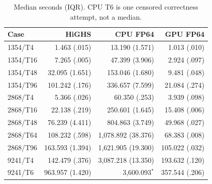 \documentclass[10pt,journal]{IEEEtran}
\begin{document}
\begin{table}[!t]
\caption{Median seconds (IQR). CPU T6 is one censored correctness attempt,
not a median.}
\label{tab:dispersion}
\centering
\scriptsize
\setlength{\tabcolsep}{2.1pt}
\renewcommand{\arraystretch}{0.92}
\begin{tabular}{@{}lrrr@{}}
\toprule
Case & HiGHS & CPU FP64 & GPU FP64 \\
\midrule
1354/T4  & 1.463 (.015) & 13.190 (1.571) & 1.013 (.010) \\
1354/T16 & 7.265 (.005) & 47.399 (3.906) & 2.924 (.097) \\
1354/T48 & 32.095 (1.651) & 153.046 (1.680) & 9.481 (.048) \\
1354/T96 & 101.242 (.176) & 336.657 (7.599) & 21.084 (.274) \\
2868/T4  & 5.366 (.026) & 60.350 (.253) & 3.939 (.098) \\
2868/T16 & 22.138 (.219) & 250.601 (1.645) & 15.408 (.006) \\
2868/T48 & 76.239 (4.411) & 804.863 (3.749) & 49.968 (.027) \\
2868/T64 & 108.232 (.598) & 1,078.892 (38.376) & 68.383 (.008) \\
2868/T96 & 163.593 (1.394) & 1,621.905 (19.300) & 105.022 (.032) \\
9241/T4  & 142.479 (.376) & 3,087.218 (13.350) & 193.632 (.120) \\
9241/T6  & 963.957 (1.420) & 3,600.093$^\ast$ & 357.544 (.206) \\
\bottomrule
\end{tabular}
\end{table}
\end{document}
